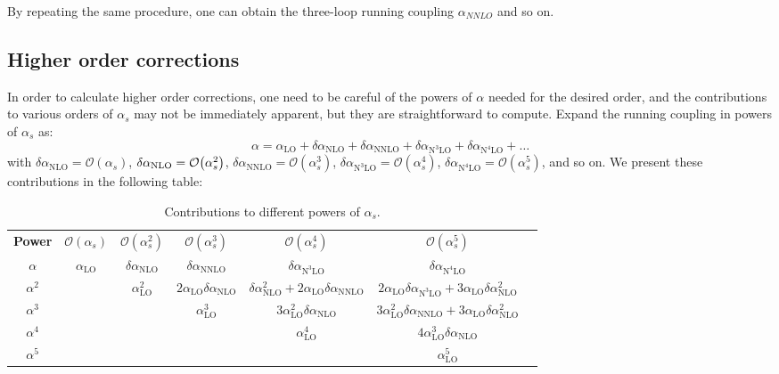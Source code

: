 \documentclass[../main.tex]{subfiles}
\begin{document}
By repeating the same procedure, one can obtain the three-loop running coupling $\alpha_{NNLO}$ and so on.

\subsection{Higher order corrections}

In order to calculate higher order corrections, one need to be careful of the powers of $\alpha$ needed for the desired order, 
and the contributions to various orders of $\alpha_s$ may not be immediately apparent, but they are straightforward to compute.
Expand the running coupling in powers of $\alpha_s$ as: 
\begin{equation}
    \alpha = \alpha_{\text{LO}} + \delta\alpha_{\text{NLO}} + \delta\alpha_{\text{NNLO}} + \delta\alpha_{\text{N}^3\text{LO}} + \delta\alpha_{\text{N}^4\text{LO}} + \ldots
\end{equation} 
with $\delta\alpha_{\text{NLO}} = \mathcal{O}(\alpha_s)$, $\delta\alpha_{\text{NLO}} = \order{\alpha_s^2}$, $\delta\alpha_{\text{NNLO}} = \mathcal{O}(\alpha_s^3)$,
 $\delta\alpha_{\text{N}^3\text{LO}} = \mathcal{O}(\alpha_s^4)$, $\delta\alpha_{\text{N}^4\text{LO}} = \mathcal{O}(\alpha_s^5)$, and so on.
We present these contributions in the following table:
\begin{table}[htbp] %
    \centering
    \scriptsize
    \begin{tabular}{c c c c c c c}
        \textbf{Power} & $\mathcal{O}(\alpha_s)$ & $\mathcal{O}(\alpha_s^2)$ & $\mathcal{O}(\alpha_s^3)$ 
        & $\mathcal{O}(\alpha_s^4)$ & $\mathcal{O}(\alpha_s^5)$\\
     
        $\alpha$ & $\alpha_{\text{LO}}$ & $\delta\alpha_{\text{NLO}}$ & $\delta\alpha_{\text{NNLO}}$ & $\delta\alpha_{\text{N}^3\text{LO}}$ & $\delta\alpha_{\text{N}^4\text{LO}}$  \\
        $\alpha^2$ &  & $\alpha_{\text{LO}}^2$ & $2\alpha_{\text{LO}}\delta\alpha_{\text{NLO}}$ & $\delta\alpha_{\text{NLO}}^2+2\alpha_{\text{LO}}\delta\alpha_{\text{NNLO}}$ &
        $2\alpha_{\text{LO}}\delta\alpha_{\text{N}^3\text{LO}}+3\alpha_{\text{LO}}\delta\alpha_{\text{NLO}}^2$ \\
        $\alpha^3$ &  & & $\alpha_{\text{LO}}^3$ & $3\alpha_{\text{LO}}^2 \delta\alpha_{\text{NLO}}$& $3\alpha_{\text{LO}}^2\delta\alpha_{\text{NNLO}}+3\alpha_{\text{LO}}\delta\alpha_{\text{NLO}}^2$  \\
        $\alpha^4$ &  & & & $\alpha_{\text{LO}}^4$ & $4 \alpha_{\text{LO}}^3 \delta\alpha_{\text{NLO}}$  \\
        $\alpha^5$ &  & & & & $\alpha_{\text{LO}}^5$ \\
    \end{tabular}
    
    \caption{Contributions to different powers of $\alpha_s$.}
    \label{tab:contributions to different powers of alpha_s}
\end{table}
\end{document}
